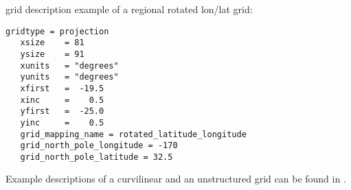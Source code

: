 \vspace{2mm}

{\CDO} grid description example of a regional rotated lon/lat grid:
\begin{lstlisting}[frame=single, backgroundcolor=\color{pcolor1}, basicstyle=\footnotesize]
   gridtype = projection
   xsize    = 81
   ysize    = 91
   xunits   = "degrees"
   yunits   = "degrees"
   xfirst   =  -19.5
   xinc     =    0.5
   yfirst   =  -25.0
   yinc     =    0.5
   grid_mapping_name = rotated_latitude_longitude
   grid_north_pole_longitude = -170
   grid_north_pole_latitude = 32.5
\end{lstlisting}

Example {\CDO} descriptions of a curvilinear and an unstructured grid can be found
in .








